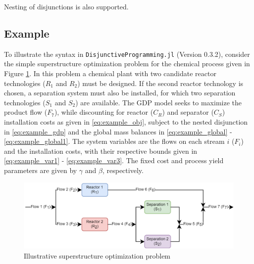 \documentclass{juliacon}
\begin{document}
\vskip 6pt
Nesting of disjunctions is also supported.

\subsection{Example}
To illustrate the syntax in \verb|DisjunctiveProgramming.jl| (Version 0.3.2), consider the simple superstructure optimization problem for the chemical process given in Figure \ref{fig:superstruct_opt_diagram}. In this problem a chemical plant with two candidate reactor technologies ($R_1$ and $R_2$) must be designed. If the second reactor technology is chosen, a separation system must also be installed, for which two separation technologies ($S_1$ and $S_2$) are available. The GDP model seeks to maximize the product flow ($F_7$), while discounting for reactor ($C_R$) and separator ($C_S$) installation costs as given in \eqref{eq:example_obj}, subject to the nested disjunction in \eqref{eq:example_gdp} and the global mass balances in \eqref{eq:example_global}
- \eqref{eq:example_global1}. The system variables are the flows on each stream $i$ ($F_i$) and the installation costs, with their respective bounds given in \eqref{eq:example_var1} - \eqref{eq:example_var3}. The fixed cost and process yield parameters are given by $\gamma$ and $\beta$, respectively.

\begin{figure}
    \centering
    \includegraphics[scale=0.4]{superstructure_pfd.png}
    \caption{Illustrative superstructure optimization problem}
    \label{fig:superstruct_opt_diagram}
\end{figure}
\end{document}
